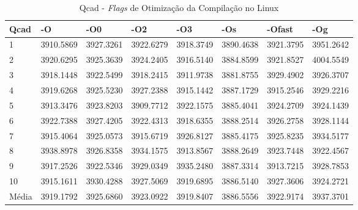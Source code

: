 \begin{apendicesenv}
\begin{table}[!ht]
\centering
\tiny
\caption{Qcad - \textit{Flags} de Otimização da Compilação no Linux}
\label{tab:otimizacao_compilacao:linux:qcad}
\begin{tabular}{llllllll}
\textbf{Qcad}            & \textbf{-O}  & \textbf{-O0}   & \textbf{-O2} & \textbf{-O3} & \textbf{-Os} & \textbf{-Ofast} & \textbf{-Og} \\ \toprule
1                        & 3910.5869    &  3927.3261     &  3922.6279   &   3918.3749  &   3890.4638  &    3921.3795    &   3951.2642           \\ 
2                        & 3920.6295    &  3925.3639     &  3924.2405   &   3916.5140  &   3884.8599  &    3921.8527    &   4004.5549           \\ 
3                        & 3918.1448    &  3922.5499     &  3918.2415   &   3911.9738  &   3881.8755  &    3929.4902    &   3926.3707           \\ 
4                        & 3919.6268    &  3925.5230     &  3927.2388   &   3915.1442  &   3887.1729  &    3915.2546    &   3929.2216           \\ 
5                        & 3913.3476    &  3923.8203     &  3909.7712   &   3922.1575  &   3885.4041  &    3924.2709    &   3924.1439           \\ 
6                        & 3922.7388    &  3927.4205     &  3922.4313   &   3918.6355  &   3888.2514  &    3926.2758    &   3928.1144           \\ 
7                        & 3915.4064    &  3925.0573     &  3915.6719   &   3926.8127  &   3885.4175  &    3925.8235    &   3934.5177           \\ 
8                        & 3938.8978    &  3926.8358     &  3934.1575   &   3913.8567  &   3888.2649  &    3923.7448    &   3922.4567           \\ 
9                        & 3917.2526    &  3922.5346     &  3929.0349   &   3935.2480  &   3887.3314  &    3913.7215    &   3928.7853           \\ 
10                       & 3915.1611    &  3930.4288     &  3927.5069   &   3919.6895  &   3886.5140  &    3927.3606    &   3924.2721           \\ \bottomrule
Média                    & 3919.1792    &  3925.6860     &  3923.0922   &   3919.8407  &   3886.5556  &    3922.9174    &   3937.3701           \\ 
\end{tabular}
\end{table}


\end{apendicesenv}
